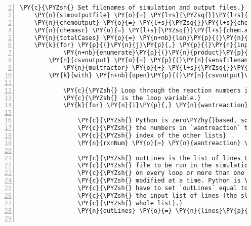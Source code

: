 \begin{Verbatim}[commandchars=\\\{\},fontsize=\small,numbers=left,firstnumber=1,stepnumber=2,firstline=2]
    \PY{c}{\PYZsh{} Set filenames of simulation and output files.}
    \PY{n}{simoutputfile} \PY{o}{=} \PY{l+s}{\PYZsq{}}\PY{l+s}{test.out}\PY{l+s}{\PYZsq{}}
    \PY{n}{chemoutput} \PY{o}{=} \PY{l+s}{\PYZsq{}}\PY{l+s}{chem.out}\PY{l+s}{\PYZsq{}}
    \PY{n}{chemasc} \PY{o}{=} \PY{l+s}{\PYZsq{}}\PY{l+s}{chem.asc}\PY{l+s}{\PYZsq{}}
    \PY{n}{totalCases} \PY{o}{=} \PY{n+nb}{len}\PY{p}{(}\PY{n}{wantreactions}\PY{p}{)}\PY{o}{*}\PY{n+nb}{len}\PY{p}{(}\PY{n}{siminputfiles}\PY{p}{)}\PY{o}{*}\PY{n+nb}{len}\PY{p}{(}\PY{n}{multfactors}\PY{p}{)}
    \PY{k}{for} \PY{p}{(}\PY{n}{j}\PY{p}{,} \PY{p}{(}\PY{n}{inpfile}\PY{p}{,} \PY{n}{multfactor}\PY{p}{)} \PY{o+ow}{in}
            \PY{n+nb}{enumerate}\PY{p}{(}\PY{n}{product}\PY{p}{(}\PY{n}{siminputfiles}\PY{p}{,} \PY{n}{multfactors}\PY{p}{)}\PY{p}{)}\PY{p}{)}\PY{p}{:}
        \PY{n}{csvoutput} \PY{o}{=} \PY{p}{(}\PY{n}{sensfilenamebase} \PY{o}{+} \PY{l+s}{\PYZsq{}}\PY{l+s}{\PYZus{}}\PY{l+s}{\PYZsq{}} \PY{o}{+} \PY{n}{inpfile}\PY{o}{.}\PY{n}{strip}\PY{p}{(}\PY{l+s}{\PYZsq{}}\PY{l+s}{.inp}\PY{l+s}{\PYZsq{}}\PY{p}{)} \PY{o}{+} \PY{l+s}{\PYZsq{}}\PY{l+s}{\PYZus{}}\PY{l+s}{\PYZsq{}} \PY{o}{+}
            \PY{n}{multfactor} \PY{o}{+} \PY{l+s}{\PYZsq{}}\PY{l+s}{x.csv}\PY{l+s}{\PYZsq{}}\PY{p}{)}
        \PY{k}{with} \PY{n+nb}{open}\PY{p}{(}\PY{n}{csvoutput}\PY{p}{,} \PY{l+s}{\PYZsq{}}\PY{l+s}{at}\PY{l+s}{\PYZsq{}}\PY{p}{)} \PY{k}{as} \PY{n}{tignsens}\PY{p}{:}

            \PY{c}{\PYZsh{} Loop through the reaction numbers in `wantreaction`. `i`}
            \PY{c}{\PYZsh{} is the loop variable.}
            \PY{k}{for} \PY{n}{i}\PY{p}{,} \PY{n}{wantreaction} \PY{o+ow}{in} \PY{n+nb}{enumerate}\PY{p}{(}\PY{n}{wantreactions}\PY{p}{)}\PY{p}{:}

                \PY{c}{\PYZsh{} Python is zero\PYZhy{}based, so we have to subtract 1 from}
                \PY{c}{\PYZsh{} the numbers in `wantreaction` to properly find the}
                \PY{c}{\PYZsh{} index of the other lists}
                \PY{n}{rxnNum} \PY{o}{=} \PY{n}{wantreaction} \PY{o}{\PYZhy{}} \PY{l+m+mi}{1}

                \PY{c}{\PYZsh{} outLines is the list of lines to write to the chem.inp}
                \PY{c}{\PYZsh{} file to be run in the simulation. It needs to be reset}
                \PY{c}{\PYZsh{} on every loop or more than one reaction will be}
                \PY{c}{\PYZsh{} modified at a time. Python is \PYZdq{}pointer\PYZhy{}based\PYZdq{}, so we}
                \PY{c}{\PYZsh{} have to set `outLines` equal to a slice of `lines`,}
                \PY{c}{\PYZsh{} the input list of lines (the slice happens to be the}
                \PY{c}{\PYZsh{} whole list).}
                \PY{n}{outLines} \PY{o}{=} \PY{n}{lines}\PY{p}{[}\PY{p}{:}\PY{p}{]}


\end{Verbatim}
